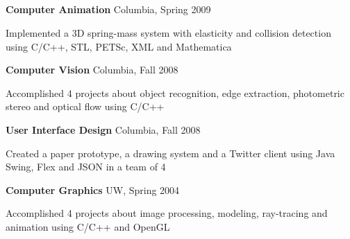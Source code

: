 \documentclass[margin,line]{resume}
\begin{document}
\begin{resume}
      

    \section{\mysidestyle [Graphics]} 

    \textbf{Computer Animation} \hfill Columbia, Spring 2009  \vspace{-3mm}\\\vspace{-1mm}%
      \begin{list2}
      \item Implemented a 3D spring-mass system with elasticity and collision detection using C/C++, STL, PETSc, XML and Mathematica       
      \end{list2}


    \textbf{Computer Vision} \hfill Columbia, Fall 2008 \vspace{-3mm}\\\vspace{-1mm}%
      \begin{list2}
      \item Accomplished 4 projects about object recognition, edge extraction, photometric stereo and optical flow using C/C++       
      \end{list2}


    \textbf{User Interface Design} \hfill Columbia, Fall 2008  \vspace{-3mm}\\\vspace{-1mm}%
      \begin{list2}
      \item Created a paper prototype, a drawing system and a Twitter client using Java Swing, Flex and JSON in a team of 4 
      \end{list2}      

    \textbf{Computer Graphics} \hfill UW, Spring 2004  \vspace{-3mm}\\\vspace{-1mm}%
      \begin{list2}
      \item Accomplished 4 projects about image processing, modeling, ray-tracing and animation using C/C++ and OpenGL       
      \end{list2}



\end{resume}
\end{document}
